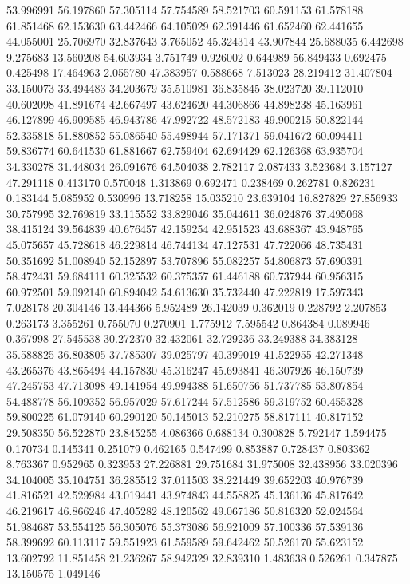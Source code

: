 53.996991
56.197860
57.305114
57.754589
58.521703
60.591153
61.578188
61.851468
62.153630
63.442466
64.105029
62.391446
61.652460
62.441655
44.055001
25.706970
32.837643
3.765052
45.324314
43.907844
25.688035
6.442698
9.275683
13.560208
54.603934
3.751749
0.926002
0.644989
56.849433
0.692475
0.425498
17.464963
2.055780
47.383957
0.588668
7.513023
28.219412
31.407804
33.150073
33.494483
34.203679
35.510981
36.835845
38.023720
39.112010
40.602098
41.891674
42.667497
43.624620
44.306866
44.898238
45.163961
46.127899
46.909585
46.943786
47.992722
48.572183
49.900215
50.822144
52.335818
51.880852
55.086540
55.498944
57.171371
59.041672
60.094411
59.836774
60.641530
61.881667
62.759404
62.694429
62.126368
63.935704
34.330278
31.448034
26.091676
64.504038
2.782117
2.087433
3.523684
3.157127
47.291118
0.413170
0.570048
1.313869
0.692471
0.238469
0.262781
0.826231
0.183144
5.085952
0.530996
13.718258
15.035210
23.639104
16.827829
27.856933
30.757995
32.769819
33.115552
33.829046
35.044611
36.024876
37.495068
38.415124
39.564839
40.676457
42.159254
42.951523
43.688367
43.948765
45.075657
45.728618
46.229814
46.744134
47.127531
47.722066
48.735431
50.351692
51.008940
52.152897
53.707896
55.082257
54.806873
57.690391
58.472431
59.684111
60.325532
60.375357
61.446188
60.737944
60.956315
60.972501
59.092140
60.894042
54.613630
35.732440
47.222819
17.597343
7.028178
20.304146
13.444366
5.952489
26.142039
0.362019
0.228792
2.207853
0.263173
3.355261
0.755070
0.270901
1.775912
7.595542
0.864384
0.089946
0.367998
27.545538
30.272370
32.432061
32.729236
33.249388
34.383128
35.588825
36.803805
37.785307
39.025797
40.399019
41.522955
42.271348
43.265376
43.865494
44.157830
45.316247
45.693841
46.307926
46.150739
47.245753
47.713098
49.141954
49.994388
51.650756
51.737785
53.807854
54.488778
56.109352
56.957029
57.617244
57.512586
59.319752
60.455328
59.800225
61.079140
60.290120
50.145013
52.210275
58.817111
40.817152
29.508350
56.522870
23.845255
4.086366
0.688134
0.300828
5.792147
1.594475
0.170734
0.145341
0.251079
0.462165
0.547499
0.853887
0.728437
0.803362
8.763367
0.952965
0.323953
27.226881
29.751684
31.975008
32.438956
33.020396
34.104005
35.104751
36.285512
37.011503
38.221449
39.652203
40.976739
41.816521
42.529984
43.019441
43.974843
44.558825
45.136136
45.817642
46.219617
46.866246
47.405282
48.120562
49.067186
50.816320
52.024564
51.984687
53.554125
56.305076
55.373086
56.921009
57.100336
57.539136
58.399692
60.113117
59.551923
61.559589
59.642462
50.526170
55.623152
13.602792
11.851458
21.236267
58.942329
32.839310
1.483638
0.526261
0.347875
13.150575
1.049146
